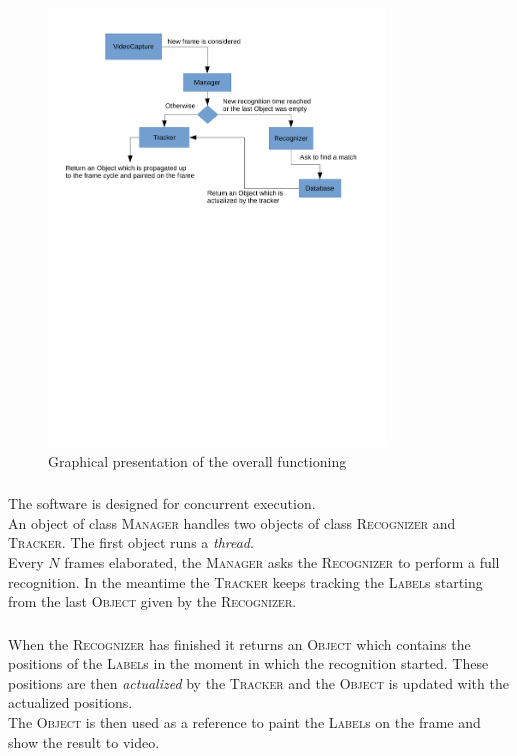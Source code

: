 \documentclass{beamer}
\begin{document}
  \begin{frame}
    \frametitle{\insertsection}
	\begin{figure}
		\centering
          \includegraphics[width=0.8\textwidth]{images/main_flow.pdf}
        \caption{Graphical presentation of the overall functioning
          \label{fig:overall}}
	\end{figure}
  \end{frame}

  \begin{frame}
    \frametitle{\insertsection}
    The software is designed for concurrent execution.\\
    An object of class \textsc{Manager} handles two objects of class
    \textsc{Recognizer} and \textsc{Tracker}. The first object runs a
    \emph{thread}.\\
    Every $N$ frames elaborated, the \textsc{Manager} asks the
    \textsc{Recognizer} to perform a full recognition. In the meantime the
    \textsc{Tracker} keeps tracking the \textsc{Label}s starting from the last
    \textsc{Object} given by the \textsc{Recognizer}.\\
  \end{frame}

  \begin{frame}
    \frametitle{\insertsection}
    When the \textsc{Recognizer} has finished it returns an \textsc{Object}
    which contains the positions of the \textsc{Label}s in the moment in which
    the recognition started. These positions are then \emph{actualized} by the
    \textsc{Tracker} and the \textsc{Object} is updated with the actualized
    positions.\\
	The \textsc{Object} is then used as a reference to paint the
    \textsc{Label}s on the frame and show the result to video.\\
  \end{frame}
\end{document}
